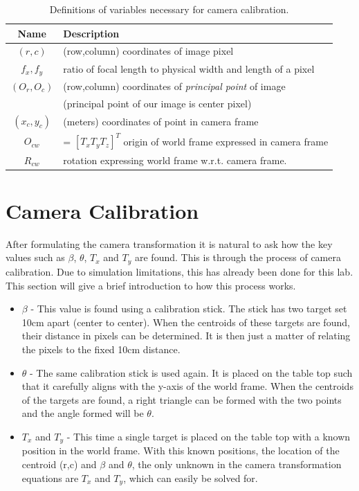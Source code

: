 \begin{table}
	\centering
	\begin{tabular}{cl}
			Name & Description \\
		  \hline
			$(r,c)$     & (row,column) coordinates of image pixel \\
			$f_x,f_y$ & ratio of focal length to physical width and length of a pixel \\
			$(O_r,O_c)$ & (row,column) coordinates of {\it principal point} of image\\
            & (principal point of our image is center pixel) \\
			$(x_c,y_c)$ & (meters) coordinates of point in camera frame \\
			$O_{cw}$		& = $[T_x T_y T_z]^T$ origin of world frame expressed in camera frame \\
			$R_{cw}$     & rotation expressing world frame w.r.t. camera frame. \\
		  \hline
	\end{tabular}
	\caption{Definitions of variables necessary for camera calibration.}
	\label{tab:DOV}
\end{table}


\section{Camera Calibration}
After formulating the camera transformation it is natural to ask how the key values such as $\beta$, $\theta$, $T_{x}$ and $T_{y}$ are found.  This is through the process of camera calibration.  Due to simulation limitations, this has already been done for this lab.  This section will give a brief introduction to how this process works.
\begin{itemize}
    \item $\beta$ - This value is found using a calibration stick.  The stick has two target set 10cm apart (center to center).  When the centroids of these targets are found, their distance in pixels can be determined.  It is then just a matter of relating the pixels to the fixed 10cm distance.
    \item $\theta$ - The same calibration stick is used again.  It is placed on the table top such that it carefully aligns with the y-axis of the world frame.  When the centroids of the targets are found, a right triangle can be formed with the two points and the angle formed will be $\theta$.
    \item $T_{x}$ and $T_{y}$ - This time a single target is placed on the table top with a known position in the world frame.  With this known positions, the location of the centroid (r,c) and $\beta$ and $\theta$, the only unknown in the camera transformation equations are $T_{x}$ and $T_{y}$, which can easily be solved for.
\end{itemize}






